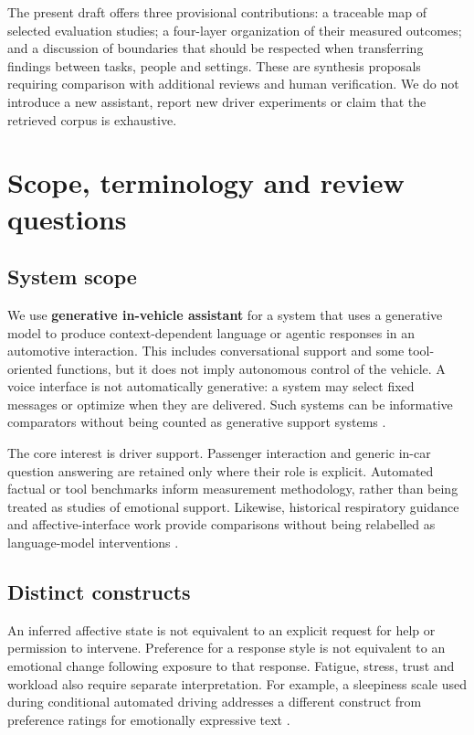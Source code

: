\documentclass[11pt,a4paper]{article}
\begin{document}
The present draft offers three provisional contributions: a traceable
map of selected evaluation studies; a four-layer organization of their
measured outcomes; and a discussion of boundaries that should be
respected when transferring findings between tasks, people and settings.
These are synthesis proposals requiring comparison with additional
reviews and human verification. We do not introduce a new assistant,
report new driver experiments or claim that the retrieved corpus is
exhaustive.

\section{Scope, terminology and review
questions}\label{scope-terminology-and-review-questions}

\subsection{System scope}\label{system-scope}

We use \textbf{generative in-vehicle assistant} for a system that uses a
generative model to produce context-dependent language or agentic
responses in an automotive interaction. This includes conversational
support and some tool-oriented functions, but it does not imply
autonomous control of the vehicle. A voice interface is not
automatically generative: a system may select fixed messages or optimize
when they are delivered. Such systems can be informative comparators
without being counted as generative support systems \citep{S12, S13}.

The core interest is driver support. Passenger interaction and generic
in-car question answering are retained only where their role is
explicit. Automated factual or tool benchmarks inform measurement
methodology, rather than being treated as studies of emotional support.
Likewise, historical respiratory guidance and affective-interface work
provide comparisons without being relabelled as language-model
interventions \citep{S1, S2, S3}.

\subsection{Distinct constructs}\label{distinct-constructs}

An inferred affective state is not equivalent to an explicit request for
help or permission to intervene. Preference for a response style is not
equivalent to an emotional change following exposure to that response.
Fatigue, stress, trust and workload also require separate
interpretation. For example, a sleepiness scale used during conditional
automated driving addresses a different construct from preference
ratings for emotionally expressive text \citep{S5, S11}.
\end{document}
